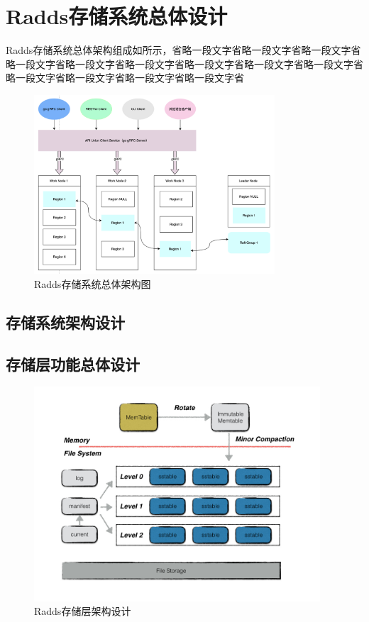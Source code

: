 \section{Radds存储系统总体设计}

	Radds存储系统总体架构组成如所示，省略一段文字省略一段文字省略一段文字省略一段文字省略一段文字省略一段文字省略一段文字省略一段文字省略一段文字省略一段文字省略一段文字省略一段文字省略一段文字省
		
	\begin{figure}[H]
		\centering
		\includegraphics[width=0.80\textwidth]{images/radds_system_arch}
		\caption{Radds存储系统总体架构图}
		\label{overall_structure}
	\end{figure}
	
	\subsection{存储系统架构设计}
		  
		  
	\subsection{存储层功能总体设计}
			
	\begin{figure}[H]
		\centering
		\includegraphics[width=0.95\textwidth]{images/radds_storage_arch}
		\caption{Radds存储层架构设计}
		\label{mobile_overall_design}
	\end{figure}


